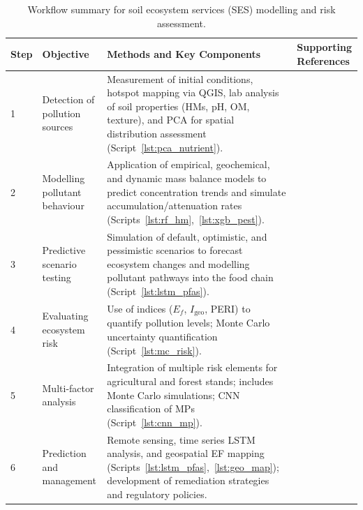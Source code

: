 \documentclass[land,article,submit,pdftex,moreauthors]{Definitions/mdpi}
\begin{document}
\begin{table}[H]
\caption{Workflow summary for soil ecosystem services (SES) modelling and
    risk assessment.\label{tab:ses_workflow_v2}}
\begin{tabularx}{\textwidth}{p{0.6cm} p{3.0cm} X p{3.5cm}}
\toprule
\textbf{Step} & \textbf{Objective} & \textbf{Methods and Key Components}
    & \textbf{Supporting References} \\
\midrule
1 & Detection of pollution sources
    & Measurement of initial conditions, hotspot mapping via QGIS, lab
      analysis of soil properties (HMs, pH, OM, texture), and PCA for
      spatial distribution assessment (Script~\ref{lst:pca_nutrient}).
    & \cite{Adewumi2024,ElSorogy2025,Feng2024,Lemenkova2021,Mukhopadhyay2020,Wan2019} \\[6pt]
2 & Modelling pollutant behaviour
    & Application of empirical, geochemical, and dynamic mass balance models
      to predict concentration trends and simulate accumulation/attenuation
      rates (Scripts~\ref{lst:rf_hm},~\ref{lst:xgb_pest}).
    & \cite{Giannakis2017,Koukianaki2025,LindhLemenkova2022b,Mohammad2025,PerezLucas2025,Xu2026} \\[6pt]
3 & Predictive scenario testing
    & Simulation of default, optimistic, and pessimistic scenarios to
      forecast ecosystem changes and modelling pollutant pathways into the
      food chain (Script~\ref{lst:lstm_pfas}).
    & \cite{Appel2022,GonzalezRodriguez2011,Hossini2025,Lemenkova2024a,Wang2025,Yasir2025} \\[6pt]
4 & Evaluating ecosystem risk
    & Use of indices ($E_f$, $I_{\mathrm{geo}}$, PERI) to quantify
      pollution levels; Monte Carlo uncertainty quantification
      (Script~\ref{lst:mc_risk}).
    & \cite{AnsoarRodriguez2025,Chukwuonye2025,Egbueri2020,Ferreira2022,Kim2024,Li2025a} \\[6pt]
5 & Multi-factor analysis
    & Integration of multiple risk elements for agricultural and forest
      stands; includes Monte Carlo simulations; CNN classification of MPs
      (Script~\ref{lst:cnn_mp}).
    & \cite{Lemenkova2025c,Li2025a,Lu2020,Olah2025,Proshad2025,Wang2024b} \\[6pt]
6 & Prediction and management
    & Remote sensing, time series LSTM analysis, and geospatial EF mapping
      (Scripts~\ref{lst:lstm_pfas},~\ref{lst:geo_map}); development of
      remediation strategies and regulatory policies.
    & \cite{Fan2025,Lemenkova2025e,Lemenkova2025d,Pan2019,Stojic2019,Xu2025} \\
\bottomrule
\end{tabularx}
\end{table}
\end{document}
